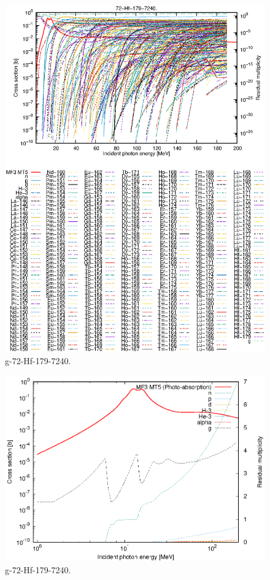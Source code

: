 \begin{figure}
 \includegraphics[width=\linewidth]{eps/g_72-Hf-179_7240.eps}
  \caption{g-72-Hf-179-7240.}
\end{figure}
\newpage \clearpage

\begin{figure}
 \includegraphics[width=\linewidth]{eps-log/g_72-Hf-179_7240.eps}
 \caption{g-72-Hf-179-7240.}
\end{figure}
\newpage \clearpage

